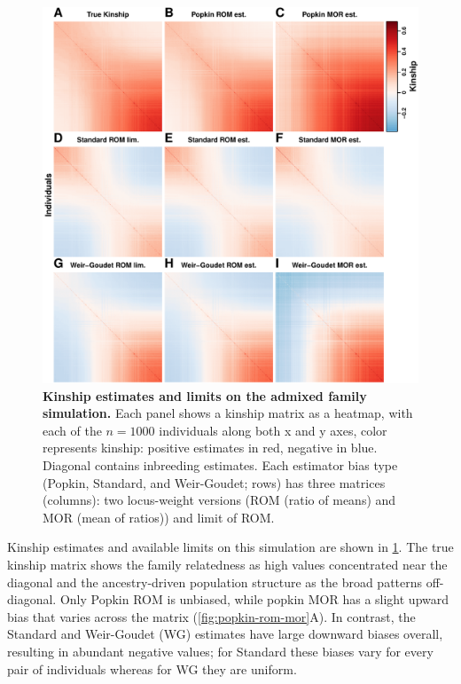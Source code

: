 \documentclass[11pt]{article}
\begin{document}
\begin{figure}[bp!]
  \centering
  \includegraphics[height=0.8\textheight]{sim-admix-n1000-m100000-k3-f0.3-s0.5-mc100-h0.8-g20-fes/kinship.pdf}
  \caption{
    {\bf Kinship estimates and limits on the admixed family simulation.}
    Each panel shows a kinship matrix as a heatmap, with each of the $n=1000$ individuals along both x and y axes, color represents kinship: positive estimates in red, negative in blue.
    Diagonal contains inbreeding estimates.
    Each estimator bias type (Popkin, Standard, and Weir-Goudet; rows) has three matrices (columns): two locus-weight versions (ROM (ratio of means) and MOR (mean of ratios)) and limit of ROM.
  }
  \label{fig:kinship_sim}
\end{figure}

Kinship estimates and available limits on this simulation are shown in \cref{fig:kinship_sim}.
The true kinship matrix shows the family relatedness as high values concentrated near the diagonal and the ancestry-driven population structure as the broad patterns off-diagonal.
Only Popkin ROM is unbiased, while popkin MOR has a slight upward bias that varies across the matrix (\cref{fig:popkin-rom-mor}A).
In contrast, the Standard and Weir-Goudet (WG) estimates have large downward biases overall, resulting in abundant negative values; for Standard these biases vary for every pair of individuals whereas for WG they are uniform.
\end{document}
